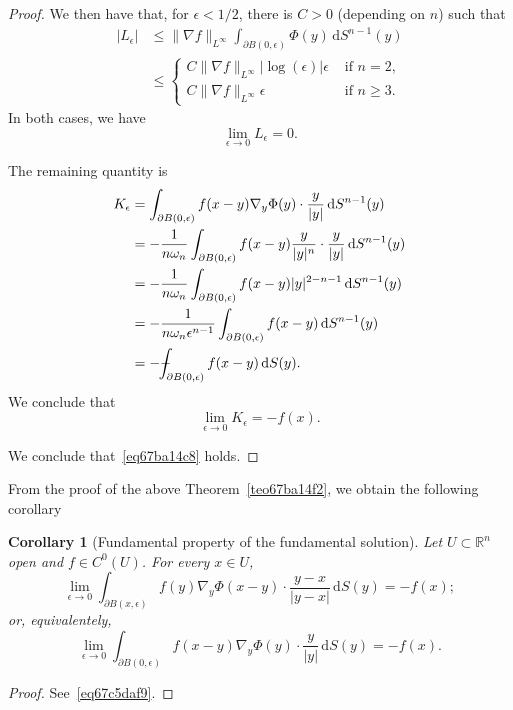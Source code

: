 \documentclass[a4paper,9pt]{amsart}
\newcommand{\R}{\mathbb{R}}	%
\newcommand{\did}{\,\mathrm{d}}	%
\newcommand{\de}{\partial}		%
\newcommand{\grad}{\nabla}
\def\Xint#1{\mathchoice
      {\XXint\displaystyle\textstyle{#1}}%
      {\XXint\textstyle\scriptstyle{#1}}%
      {\XXint\scriptstyle\scriptscriptstyle{#1}}%
      {\XXint\scriptscriptstyle\scriptscriptstyle{#1}}%
      \!\int}
\def\XXint#1#2#3{{\setbox0=\hbox{$#1{#2#3}{\int}$}
        \vcenter{\hbox{$#2#3$}}\kern-.5\wd0}}
\def\fint{\Xint-}
\theoremstyle{plain}
\newtheorem{corollary}[proposition]{Corollary}
\theoremstyle{definition}
\theoremstyle{remark}
\begin{document}
\begin{proof}
	We then have that, for $\epsilon<1/2$, there is $C>0$ (depending on $n$) such that 
	\begin{align*}
	|L_\epsilon| 
	&\le \|\grad f\|_{L^\infty} \int_{\de B(0,\epsilon)}  \Phi(y)  \did S^{n-1}(y) \\
	&\le \begin{cases}
	C \|\grad f\|_{L^\infty} |\log(\epsilon)|\epsilon & \text{ if }n=2 , \\
	C \|\grad f\|_{L^\infty} \epsilon & \text{ if }n\ge3 .
	\end{cases}
	\end{align*}
	In both cases, we have 
	\begin{equation}\label{eq67ba13a8}
		\lim_{\epsilon\to0} L_\epsilon = 0 .
	\end{equation}
	
	The remaining quantity is
	\begin{align*}
	K_\epsilon 
	&= \int_{\de B(0,\epsilon)} f(x-y) \grad_y\Phi(y)  \cdot \frac{y}{|y|} \did S^{n-1}(y) \\
	&= - \frac1{n\omega_n } \int_{\de B(0,\epsilon)} f(x-y) \frac{y}{|y|^n}  \cdot \frac{y}{|y|} \did S^{n-1}(y) \\
	&= - \frac1{n\omega_n } \int_{\de B(0,\epsilon)} f(x-y) |y|^{2-n-1} \did S^{n-1}(y) \\
	&= - \frac1{n\omega_n \epsilon^{n-1}} \int_{\de B(0,\epsilon)} f(x-y) \did S^{n-1}(y) \\
	&= - \fint_{\de B(0,\epsilon)} f(x-y) \did S(y) .
	\end{align*}
	We conclude that 
	\begin{equation}\label{eq67c5daf9}
		\lim_{\epsilon\to0} K_\epsilon = - f(x) .
	\end{equation}
	
	We conclude that~\eqref{eq67ba14c8} holds.
\end{proof}

From the proof of the above Theorem~\ref{teo67ba14f2}, we obtain the following corollary
\begin{corollary}[Fundamental property of the fundamental solution]\label{cor67c6cc59}
	Let $U\subset\R^n$ open and $f\in C^0(U)$.
	For every $x\in U$,
	\begin{equation}\label{eq67c6cca3}
		\lim_{\epsilon\to0} \int_{\de B(x,\epsilon)} f(y) \grad_y\Phi(x-y)  \cdot \frac{y-x}{|y-x|} \did S(y)
		= -f(x) ;
	\end{equation}
	or, equivalentely,
	\begin{equation}
		\lim_{\epsilon\to0} \int_{\de B(0,\epsilon)} f(x-y) \grad_y\Phi(y)  \cdot \frac{y}{|y|} \did S(y) 
		= -f(x) .
	\end{equation}
\end{corollary}
\begin{proof}
	See~\eqref{eq67c5daf9}.
\end{proof}
\end{document}
